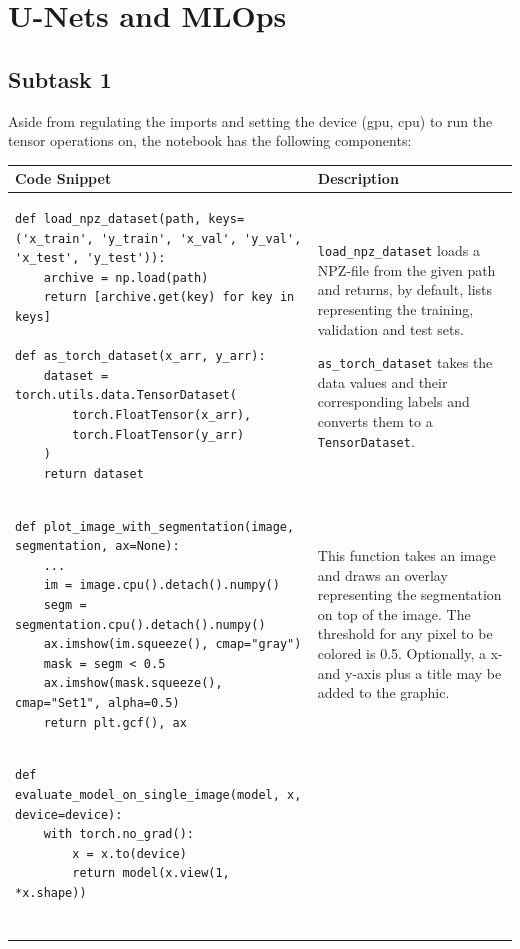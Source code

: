 \section{U-Nets and MLOps}
\subsection*{Subtask 1}

Aside from regulating the imports and setting the device (gpu, cpu) to run the tensor operations on, the notebook has the following components:

\footnotesize
\begin{longtable}{|m{}|m{}|} \hline
\textbf{Code Snippet} & \textbf{Description} \\ \hline
\begin{lstlisting}
def load_npz_dataset(path, keys=('x_train', 'y_train', 'x_val', 'y_val', 'x_test', 'y_test')):
    archive = np.load(path)
    return [archive.get(key) for key in keys]

def as_torch_dataset(x_arr, y_arr):
    dataset = torch.utils.data.TensorDataset(
        torch.FloatTensor(x_arr),
        torch.FloatTensor(y_arr)
    )
    return dataset
\end{lstlisting} & \lstinline|load_npz_dataset| loads a NPZ-file from the given path and returns, by default, lists representing the training, validation and test sets.\vspace{8px}

\lstinline|as_torch_dataset| takes the data values and their corresponding labels and converts them to a \lstinline|TensorDataset|.
\\ \hline
\begin{lstlisting}
def plot_image_with_segmentation(image, segmentation, ax=None):
    ...
    im = image.cpu().detach().numpy()
    segm = segmentation.cpu().detach().numpy()
    ax.imshow(im.squeeze(), cmap="gray")
    mask = segm < 0.5
    ax.imshow(mask.squeeze(), cmap="Set1", alpha=0.5)
    return plt.gcf(), ax
\end{lstlisting} & This function takes an image and draws an overlay representing the segmentation on top of the image. The threshold for any pixel to be colored is 0.5. Optionally, a x- and y-axis plus a title may be added to the graphic.
\\ \hline
\begin{lstlisting}
def evaluate_model_on_single_image(model, x, device=device):
    with torch.no_grad():
        x = x.to(device)
        return model(x.view(1, *x.shape))
        

\end{lstlisting}
\end{longtable}
